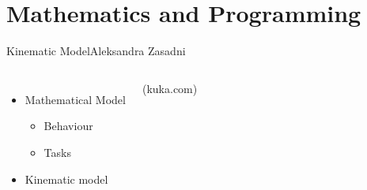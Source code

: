 \section{Mathematics and Programming}
\begin{frame}{Kinematic Model}{Aleksandra Zasadni}
\begin{columns}
    \begin{itemize}
        \item Mathematical Model 
        \begin{itemize}
            \item Behaviour
            \item Tasks
        \end{itemize}
        \item Kinematic model
    \end{itemize}    

\tiny{(kuka.com)}
\end{columns}
\end{frame}

